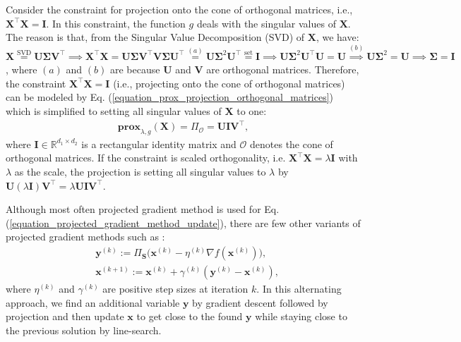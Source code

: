 \documentclass[lang=cn,10pt]{gorgeousnbook}
\numberwithin{equation}{section}%
\numberwithin{figure}{section}%
\begin{document}
\begin{lemma}
Consider the constraint for projection onto the cone of orthogonal matrices, i.e., $\boldsymbol{X}^\top \boldsymbol{X} = \boldsymbol{I}$.
In this constraint, the function $g$ deals with the singular values of $\boldsymbol{X}$. The reason is that, from the Singular Value Decomposition (SVD) of $\boldsymbol{X}$, we have: $\boldsymbol{X} \overset{\text{SVD}}{=} \boldsymbol{U} \boldsymbol{\Sigma} \boldsymbol{V}^\top \implies \boldsymbol{X}^\top \boldsymbol{X} = \boldsymbol{U} \boldsymbol{\Sigma} \boldsymbol{V}^\top \boldsymbol{V} \boldsymbol{\Sigma} \boldsymbol{U}^\top \overset{(a)}{=} \boldsymbol{U} \boldsymbol{\Sigma}^2 \boldsymbol{U}^\top \overset{\text{set}}{=} \boldsymbol{I} \implies \boldsymbol{U} \boldsymbol{\Sigma}^2 \boldsymbol{U}^\top \boldsymbol{U} = \boldsymbol{U} \overset{(b)}{\implies} \boldsymbol{U} \boldsymbol{\Sigma}^2 = \boldsymbol{U} \implies \boldsymbol{\Sigma} = \boldsymbol{I}$, where $(a)$ and $(b)$ are because $\boldsymbol{U}$ and $\boldsymbol{V}$ are orthogonal matrices. 
Therefore, the constraint $\boldsymbol{X}^\top \boldsymbol{X} = \boldsymbol{I}$ (i.e., projecting onto the cone of orthogonal matrices) can be modeled by Eq. (\ref{equation_prox_projection_orthogonal_matrices}) which is simplified to setting all singular values of $\boldsymbol{X}$ to one:
\begin{align}\label{equation_prox_projection_orthogonal_matrices2}
\textbf{prox}_{\lambda, g}(\boldsymbol{X}) = \Pi_{\mathcal{O}} = \boldsymbol{U} \boldsymbol{I} \boldsymbol{V}^\top,
\end{align}
where $\boldsymbol{I} \in \mathbb{R}^{d_1 \times d_2}$ is a rectangular identity matrix and $\mathcal{O}$ denotes the cone of orthogonal matrices.
If the constraint is scaled orthogonality, i.e. $\boldsymbol{X}^\top \boldsymbol{X} = \lambda \boldsymbol{I}$ with $\lambda$ as the scale, the projection is setting all singular values to $\lambda$ by $\boldsymbol{U} (\lambda \boldsymbol{I}) \boldsymbol{V}^\top = \lambda \boldsymbol{U} \boldsymbol{I} \boldsymbol{V}^\top$.
\end{lemma}

Although most often projected gradient method is used for Eq. (\ref{equation_projected_gradient_method_update}), there are few other variants of projected gradient methods such as \cite{drummond2004projected}: 
\begin{align}
& \boldsymbol{y}^{(k)} := \Pi_{\boldsymbol{S}} \big(\boldsymbol{x}^{(k)} - \eta^{(k)} \nabla f(\boldsymbol{x}^{(k)})\big), \\
& \boldsymbol{x}^{(k+1)} := \boldsymbol{x}^{(k)} + \gamma^{(k)} (\boldsymbol{y}^{(k)} - \boldsymbol{x}^{(k)}),
\end{align}
where $\eta^{(k)}$ and $\gamma^{(k)}$ are positive step sizes at iteration $k$. In this alternating approach, we find an additional variable $\boldsymbol{y}$ by gradient descent followed by projection and then update $\boldsymbol{x}$ to get close to the found $\boldsymbol{y}$ while staying close to the previous solution by line-search.
\end{document}
